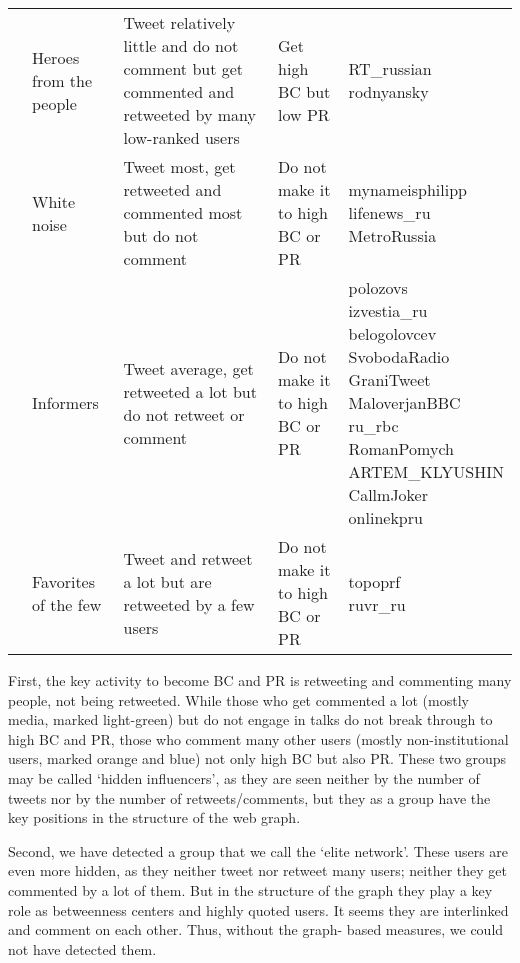 \begin{table}[ht]
\begin{adjustbox}{width=1\textwidth}
\begin{tabular}{ p{}  p{}  p{}  p{}  p{}  }
			& Heroes from the people & Tweet relatively little and do not comment but get commented and retweeted by many low-ranked users & Get high BC but low PR & \makecell[c]{RT\_russian\\rodnyansky}\\
			\multirow{3}{*}{\makecell{Unsuccessful}} & White noise & Tweet most, get retweeted and commented most but do not comment & Do not make it to high BC or PR & \makecell[c]{mynameisphilipp\\lifenews\_ru\\MetroRussia}\\
			& Informers & Tweet average, get retweeted a lot but do not retweet or comment & Do not make it to high BC or PR & \makecell[c]{polozovs\\izvestia\_ru\\belogolovcev\\SvobodaRadio\\GraniTweet\\MaloverjanBBC\\ru\_rbc\\RomanPomych\\ARTEM\_KLYUSHIN\\CallmJoker\\onlinekpru}\\
			& Favorites of the few & Tweet and retweet a lot but are retweeted by a few users & Do not make it to high BC or PR & \makecell[c]{topoprf\\ruvr\_ru}\\
			\bottomrule
		\end{tabular}%
	\end{adjustbox}
\end{table}

First, the key activity to become BC and PR is retweeting and commenting many people, not being retweeted. While those who get commented a lot (mostly media, marked light-green) but do not engage in talks do not break through to high BC and PR, those who comment many other users (mostly non-institutional users, marked orange and blue) not only high BC but also PR. These two groups may be called ‘hidden influencers’, as they are seen neither by the number of tweets nor by the number of retweets/comments, but they as a group have the key positions in the structure of the web graph.

Second, we have detected a group that we call the ‘elite network’. These users are even more hidden, as they neither tweet nor retweet many users; neither they get commented by a lot of them. But in the structure of the graph they play a key role as betweenness centers and highly quoted users. It seems they are interlinked and comment on each other. Thus, without the graph- based measures, we could not have detected them.

